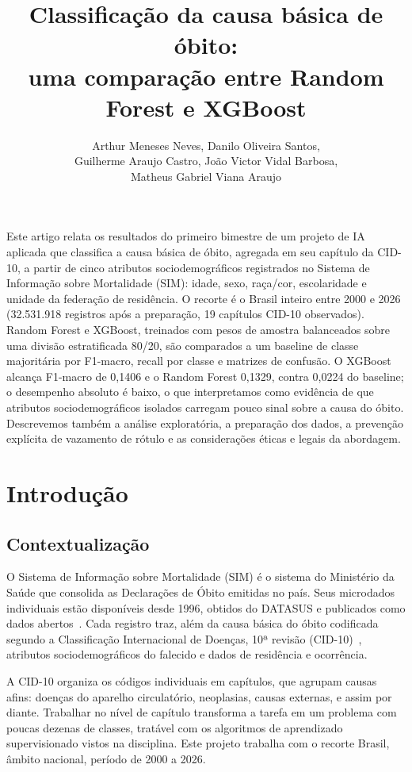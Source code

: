 \documentclass[12pt]{article}
\title{Classificação da causa básica de óbito:\\
  uma comparação entre Random Forest e XGBoost}
\author{Arthur Meneses Neves, Danilo Oliveira Santos,\\
  Guilherme Araujo Castro, João Victor Vidal Barbosa,\\
  Matheus Gabriel Viana Araujo}
\begin{document}
\maketitle

\begin{resumo}
  Este artigo relata os resultados do primeiro bimestre de um projeto de IA aplicada que classifica a causa básica de óbito, agregada em seu capítulo da CID-10, a partir de cinco atributos sociodemográficos registrados no Sistema de Informação sobre Mortalidade (SIM): idade, sexo, raça/cor, escolaridade e unidade da federação de residência. O recorte é o Brasil inteiro entre 2000 e 2026 (32.531.918 registros após a preparação, 19 capítulos CID-10 observados). Random Forest e XGBoost, treinados com pesos de amostra balanceados sobre uma divisão estratificada 80/20, são comparados a um baseline de classe majoritária por F1-macro, recall por classe e matrizes de confusão. O XGBoost alcança F1-macro de 0,1406 e o Random Forest 0,1329, contra 0,0224 do baseline; o desempenho absoluto é baixo, o que interpretamos como evidência de que atributos sociodemográficos isolados carregam pouco sinal sobre a causa do óbito. Descrevemos também a análise exploratória, a preparação dos dados, a prevenção explícita de vazamento de rótulo e as considerações éticas e legais da abordagem.
\end{resumo}

\section{Introdução}

\subsection{Contextualização}

O Sistema de Informação sobre Mortalidade (SIM) é o sistema do Ministério da Saúde que consolida as Declarações de Óbito emitidas no país. Seus microdados individuais estão disponíveis desde 1996, obtidos do DATASUS e publicados como dados abertos~\cite{pcdas_sim,sim_dadosgov}. Cada registro traz, além da causa
básica do óbito codificada segundo a Classificação Internacional de Doenças, 10ª revisão (CID-10)~\cite{who_cid10}, atributos sociodemográficos do falecido e dados de residência e ocorrência.

A CID-10 organiza os códigos individuais em capítulos, que agrupam causas afins: doenças do aparelho circulatório, neoplasias, causas externas, e assim por diante. Trabalhar no nível de capítulo transforma a tarefa em um problema com poucas dezenas de classes, tratável com os algoritmos de aprendizado supervisionado vistos na disciplina. Este projeto trabalha com o recorte Brasil, âmbito nacional, período de 2000 a 2026.
\end{document}
